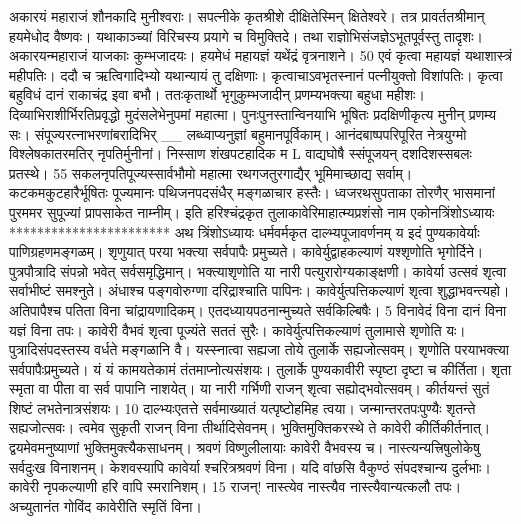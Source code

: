 अकारयं महाराजं शौनकादि मुनीश्वराः।
 सपत्नीके कृतश्रीशे दीक्षितेस्मिन् क्षितेश्वरे।
 तत्र प्रावर्ततश्रीमान् हयमेधोद वैष्णवः।
 यथाकाञ्च्यां विरिचस्य प्रयागे च विमुक्तिदे।
 तथा राज्ञोभिसंजज्ञेऽभूतपूर्वस्तु तादृशः।
 अकारयन्महाराजं याजकाः कुम्भजादयः।
 हयमेधं महायज्ञं यथेंद्रं वृत्रनाशने।
 50 एवं कृत्वा महायज्ञं यथाशास्त्रं महीपतिः।
 ददौ च ऋत्विगादिभ्यो यथान्यायं तु दक्षिणाः।
 कृत्वाचाऽवभृतस्नानं पत्नीयुक्तो विशांपतिः।
 कृत्वा बहुविधं दानं राकाचंद्र इवा बभौ।
 ततःकृतार्थो भृगुकुम्भजादीन्
प्रणम्यभक्त्या बहुधा महीशः।
 दिव्याभिराशीर्भिरतिप्रवृद्धो
मुदंसलेभेनुपमां महात्मा।
 पुनःपुनस्तान्विनयाभि भूषितः
प्रदक्षिणीकृत्य मुनीन् प्रणम्य सः।
 संपूज्यरत्नाभरणांबरादिभिर्
__ लब्ध्वाप्यनुज्ञां बहुमानपूर्विकाम्।
 आनंदबाष्पपरिपूरित नेत्रयुग्मो
विश्लेषकातरमतिर् नृपतिर्मुनीनां।
 निस्साण शंखपटहादिक
म
L
वाद्यघोषै स्संपूजयन् दशदिशस्सबलः प्रतस्थे।
55 सकलनृपतिपूज्यस्सार्वभौमो महात्मा
रथगजतुरगाद्यैर् भूमिमाच्छाद्य सर्वाम्।
 कटकमकुटहारैर्भूषितः पूज्यमानः
पथिजनपदसंधैर् मङ्गळाचार हस्तैः।
 ध्वजरथसुपताका तोरणैर् भासमानां
पुरममर सुपूज्यां प्रापसाकेत नाम्नीम्।
 इति हरिश्चंद्रकृत तुलाकावेरिमाहात्म्यप्रशंसो नाम
एकोनत्रिंशोऽध्यायः
***********************
अथ त्रिंशोऽध्यायः
धर्मवर्मकृत दाल्भ्यपूजावर्णनम् य इदं पुण्यकावेर्याः पाणिग्रहणमङ्गळम्।
 शृणुयात् परया भक्त्या सर्वपापैः प्रमुच्यते।
 कावेर्युद्वाहकल्याणं यश्शृणोति भृगोर्दिने।
 पुत्रपौत्रादि संपन्नो भवेत् सर्वसमृद्धिमान्।
 भक्त्याशृणोति या नारी पत्युरारोग्यकाङ्क्षणी।
 कावेर्या उत्सवं शृत्वा सर्वाभीष्टं समश्नुते।
 अंधाश्च पङ्गवोरुग्णा दरिद्राश्चाति पापिनः।
 कावेर्युत्पत्तिकल्याणं शृत्वा शुद्धाभवन्त्यहो।
 अतिपापैश्च पतिता विना चांद्रायणादिकम्।
 एतदध्यायपठनान्मुच्यते सर्वकिल्बिषैः।
 5
विनावेदं विना दानं विना यज्ञं विना तपः।
 कावेरी वैभवं शृत्वा पूज्यंते सततं सुरैः।
 कावेर्युत्पत्तिकल्याणं तुलामासे शृणोति यः।
 पुत्रादिसंपदस्तस्य वर्धते मङ्गळानि वै।
 यस्स्नात्वा सह्यजा तोये तुलार्के सह्यजोत्सवम्।
 शृणोति परयाभक्त्या सर्वपापैःप्रमुच्यते।
 यं यं कामयतेकामं तंतमाप्नोत्यसंशयः।
 तुलार्के पुण्यकावीरी स्पृष्टा दृष्टा च कीर्तिता।
 शृता स्मृता वा पीता वा सर्व पापानि नाशयेत्।
 या नारी गर्भिणी राजन् शृत्वा सह्योद्भवोत्सवम्।
 कीर्तयन्तं सुतं शिष्टं लभतेनात्रसंशयः।
 10 दाल्भ्यःएतत्ते सर्वमाख्यातं यत्पृष्टोहमिह त्वया।
 जन्मान्तरतपःपुण्यैः शृतन्ते सह्यजोत्सवः।
 त्वमेव सुकृती राजन् विना तीर्थादिसेवनम्।
 भुक्तिमुक्तिकरस्थे ते कावेरी कीर्तिकीर्तनात्।
 द्वयमेवमनुष्याणां भुक्तिमुक्त्यैकसाधनम्।
 श्रवणं विष्णुलीलायाः कावेरी वैभवस्य च।
 नास्त्यन्यत्त्रिषुलोकेषु सर्वदुःख विनाशनम्।
 केशवस्यापि कावेर्या श्चरित्रश्रवणं विना।
 यदि वांछसि वैकुण्ठं संपदश्चान्य दुर्लभाः।
 कावेरी नृपकल्याणी हरि वापि स्मरानिशम्।
 15
राजन्! नास्त्येव नास्त्यैव नास्त्यैवान्यत्कलौ तपः।
 अच्युतानंत गोविंद कावेरीति स्मृतिं विना।
